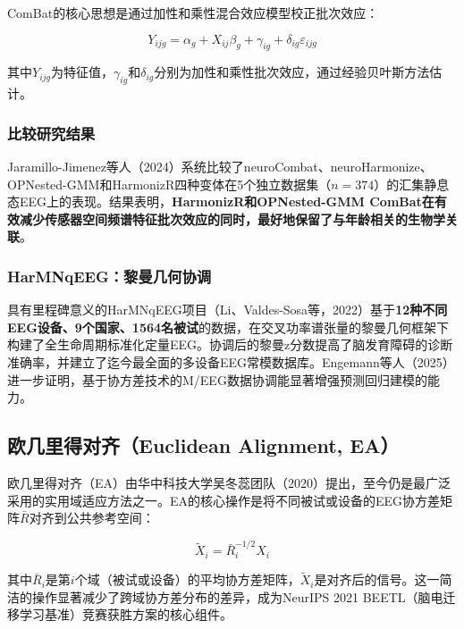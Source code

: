 \documentclass[12pt, a4paper]{article}
\begin{document}
ComBat的核心思想是通过加性和乘性混合效应模型校正批次效应：

\begin{equation}
Y_{ijg} = \alpha_g + X_{ij}\beta_g + \gamma_{ig} + \delta_{ig}\varepsilon_{ijg}
\end{equation}

其中$Y_{ijg}$为特征值，$\gamma_{ig}$和$\delta_{ig}$分别为加性和乘性批次效应，通过经验贝叶斯方法估计。

\subsubsection{比较研究结果}

Jaramillo-Jimenez等人（2024）系统比较了neuroCombat、neuroHarmonize、OPNested-GMM和HarmonizR四种变体在5个独立数据集（$n=374$）的汇集静息态EEG上的表现\citep{Jaramillo2024ComBat}。结果表明，\textbf{HarmonizR和OPNested-GMM ComBat在有效减少传感器空间频谱特征批次效应的同时，最好地保留了与年龄相关的生物学关联}。

\subsubsection{HarMNqEEG：黎曼几何协调}

具有里程碑意义的HarMNqEEG项目（Li、Valdes-Sosa等，2022）基于\textbf{12种不同EEG设备、9个国家、1564名被试}的数据，在交叉功率谱张量的黎曼几何框架下构建了全生命周期标准化定量EEG\citep{Li2022HarMNqEEG}。协调后的黎曼z分数提高了脑发育障碍的诊断准确率，并建立了迄今最全面的多设备EEG常模数据库。Engemann等人（2025）进一步证明，基于协方差技术的M/EEG数据协调能显著增强预测回归建模的能力\citep{HarmonizeCovariance2025}。

\subsection{欧几里得对齐（Euclidean Alignment, EA）}

欧几里得对齐（EA）由华中科技大学吴冬蕊团队（2020）提出\citep{He2020EA}，至今仍是最广泛采用的实用域适应方法之一。EA的核心操作是将不同被试或设备的EEG协方差矩阵$\bar{R}$对齐到公共参考空间：

\begin{equation}
\tilde{X}_i = \bar{R}_i^{-1/2} X_i
\end{equation}

其中$\bar{R}_i$是第$i$个域（被试或设备）的平均协方差矩阵，$\tilde{X}_i$是对齐后的信号。这一简洁的操作显著减少了跨域协方差分布的差异，成为NeurIPS 2021 BEETL（脑电迁移学习基准）竞赛获胜方案的核心组件\citep{RevisitEA2025}。
\end{document}
